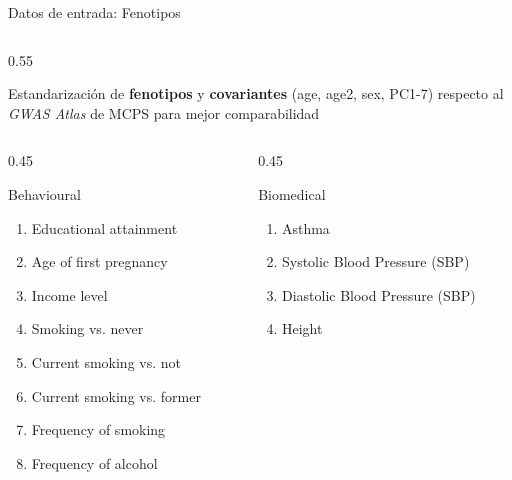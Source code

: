 \begin{frame}[fragile]{Datos de entrada: Fenotipos} %
  \sffamily
  \begin{columns}[c]
    \begin{column}{0.55\textwidth}

        {\small
        Estandarización de \textbf{fenotipos} y \textbf{covariantes} (age, age2, sex, PC1-7) respecto al \textit{GWAS Atlas} de MCPS para mejor comparabilidad\\[2pt]
        }

        \begin{columns}[T]
            \begin{column}{0.45\textwidth}
              \begin{exampleblock}{Behavioural}
              \scriptsize
              \begin{enumerate}
                \item Educational attainment
                \item Age of first pregnancy
                \item Income level
                \item Smoking vs. never
                \item Current smoking vs. not
                \item Current smoking vs. former
                \item Frequency of smoking
                \item Frequency of alcohol
              \end{enumerate}
              \end{exampleblock}
            \end{column}
            \begin{column}{0.45\textwidth}
              \begin{block}{Biomedical}
              \scriptsize
              \begin{enumerate}
                \item Asthma
                \item Systolic Blood Pressure (SBP)
                \item Diastolic Blood Pressure (SBP)
                \item Height

\end{enumerate}
\end{block}
\end{column}
\end{columns}
\end{column}
\end{columns}
\end{frame}
